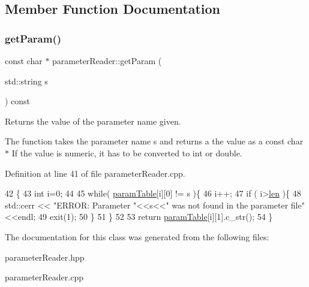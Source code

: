 \subsection{Member Function Documentation}
\mbox{\label{classparameterReader_ae5e3d2f04754357b25556f04cbe48b2e}} 
\subsubsection{\texorpdfstring{get\+Param()}{getParam()}}
{\footnotesize\ttfamily const char $\ast$ parameter\+Reader\+::get\+Param (\begin{DoxyParamCaption}\item[{std\+::string}]{s }\end{DoxyParamCaption}) const}



Returns the value of the parameter name given. 

The function takes the parameter name s and returns a the value as a const char$\ast$ If the value is numeric, it has to be converted to int or double. 

Definition at line 41 of file parameter\+Reader.\+cpp.


\begin{DoxyCode}
42 \{
43   \textcolor{keywordtype}{int} i=0;
44 
45   \textcolor{keywordflow}{while}( \hyperlink{classparameterReader_ac5b129418d06946c39462c2bf26aea54}{paramTable}[i][0] != s )\{
46     i++;
47     \textcolor{keywordflow}{if} ( i>\hyperlink{classparameterReader_a72a2ac1e23e699b2f393193193d9dda7}{len} )\{
48       std::cerr << \textcolor{stringliteral}{"ERROR: Parameter "}<<s<<\textcolor{stringliteral}{" was not found in the parameter file"}<<endl;
49       exit(1);
50     \}
51   \}
52 
53   \textcolor{keywordflow}{return} \hyperlink{classparameterReader_ac5b129418d06946c39462c2bf26aea54}{paramTable}[i][1].c\_str();
54 \}
\end{DoxyCode}


The documentation for this class was generated from the following files\+:\begin{DoxyCompactItemize}
\item 
parameter\+Reader.\+hpp\item 
parameter\+Reader.\+cpp\end{DoxyCompactItemize}
